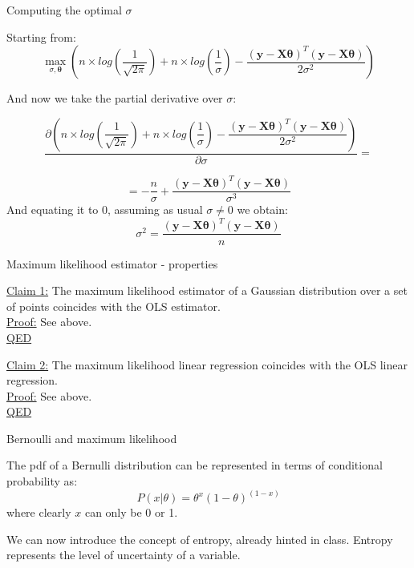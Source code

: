 \documentclass{beamer}
\begin{document}
\begin{frame}
{\centerline{Computing the optimal $\sigma$ }}
Starting from: 
$$\max_{\sigma, \boldsymbol{\theta}} \left( n \times log \left (\dfrac 1 {\sqrt{2 \pi} } \right ) + n \times log \left (\dfrac 1 {\sigma } \right ) -\dfrac { (\boldsymbol{y} - \boldsymbol{X\theta})^T (\boldsymbol{y} - \boldsymbol{X\theta})} {2 \sigma^2} \right )$$

And now we take the partial derivative over $\sigma$:

$$\frac{\partial \left( n \times log \left (\dfrac 1 {\sqrt{2 \pi} } \right ) + n \times log \left (\dfrac 1 {\sigma } \right ) -\dfrac { (\boldsymbol{y} - \boldsymbol{X\theta})^T (\boldsymbol{y} - \boldsymbol{X\theta})} {2 \sigma^2} \right )} {\partial \sigma} = $$

$$= - \dfrac n {\sigma } +  \dfrac { (\boldsymbol{y} - \boldsymbol{X\theta})^T (\boldsymbol{y} - \boldsymbol{X\theta})} { \sigma^3 } $$
And equating it to 0, assuming as usual $\sigma \ne 0$ we obtain:
$$ \sigma^2 = \dfrac { (\boldsymbol{y} - \boldsymbol{X\theta})^T (\boldsymbol{y} - \boldsymbol{X\theta})} { n }
$$


\end{frame}

\begin{frame}
{\centerline{Maximum likelihood estimator - properties}}
\underline{Claim 1:} The maximum likelihood estimator of a Gaussian distribution over a set of points coincides with the OLS estimator.\\
\underline{Proof:} See above.\\
\underline{QED}

\vspace{2cm}
\underline{Claim 2:} The maximum likelihood linear regression coincides with the OLS linear regression.\\
\underline{Proof:} See above.\\
\underline{QED}


\end{frame}


\begin{frame}
{\centerline{Bernoulli and maximum likelihood}}

The pdf of a Bernulli distribution can be represented in terms of conditional probability as:
$$ P(x | \theta) = \theta^x (1-\theta)^{(1-x)} $$
where clearly $x$ can only be 0 or 1.
\newline

We can now introduce the concept of entropy, already hinted in class. Entropy represents the level of uncertainty of a variable.


\end{frame}
\end{document}
